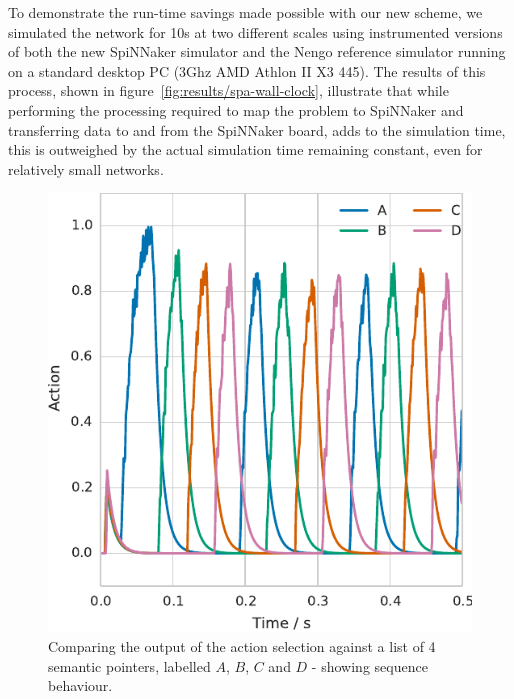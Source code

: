 \documentclass[conference]{IEEEtran}
\begin{document}
To demonstrate the run-time savings made possible with our new scheme, we simulated the network for 10s at two different scales using instrumented versions of both the new SpiNNaker simulator and the Nengo reference simulator \parencite{Bekolay2014} running on a standard desktop PC (3Ghz AMD Athlon II X3 445). 
The results of this process, shown in figure~\ref{fig:results/spa-wall-clock}, illustrate that while  performing the processing required to map the problem to SpiNNaker and transferring data to and from the SpiNNaker board, adds to the simulation time, this is outweighed by the actual simulation time remaining constant, even for relatively small networks.
 
  \begin{figure}[!t]
    \includegraphics{figures/sequence}
    \caption{Comparing the output of the action selection against a list of 4 semantic pointers, labelled $A$, $B$, $C$ and $D$ - showing sequence behaviour.}
    \label{fig:results/sequence}
  \end{figure}
\end{document}
